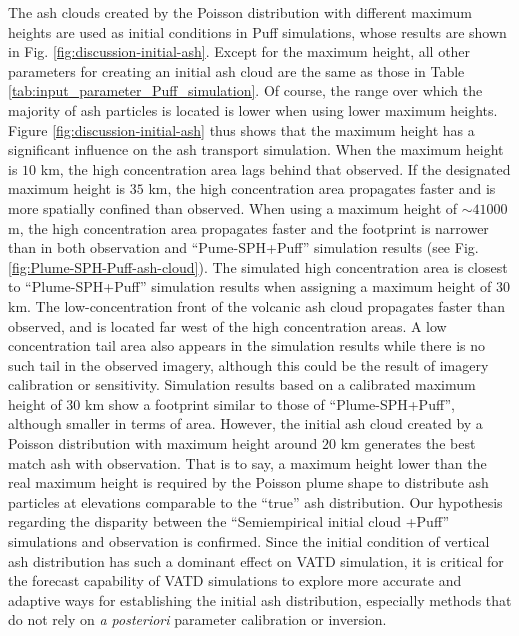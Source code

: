 \documentclass[utf8]{frontiersSCNS} %
\begin{document}
The ash clouds created by the Poisson distribution with different maximum heights are used as initial conditions in Puff simulations, whose results are shown in Fig. \ref{fig:discussion-initial-ash}. Except for the maximum height, all other parameters for creating an initial ash cloud are the same as those in Table \ref{tab:input_parameter_Puff_simulation}. Of course, the range over which the majority of ash particles is located is lower when using lower maximum heights.  Figure \ref{fig:discussion-initial-ash} thus shows that the maximum height has a significant influence on the ash transport simulation. When the maximum height is $10 $ km, the high concentration area  lags behind that observed.  If the designated maximum height is $35 $ km, the high concentration area propagates faster and is more spatially confined than observed. When using a maximum height of $\sim 41000$ m, the high concentration area propagates faster and the footprint is narrower than in both observation and ``Pume-SPH+Puff'' simulation results (see Fig. \ref{fig:Plume-SPH-Puff-ash-cloud}). The simulated high concentration area is closest to ``Plume-SPH+Puff'' simulation results when assigning a maximum height of $30$ km. The low-concentration front of the volcanic ash cloud propagates faster than observed, and is located far west of the high concentration areas. A low concentration tail area also appears in the simulation results while there is no such tail in the observed imagery, although this could be the result of imagery calibration or sensitivity. Simulation results based on a calibrated maximum height of $30 $ km show a footprint similar to those of ``Plume-SPH+Puff'', although smaller in terms of area. However, the initial ash cloud created by a Poisson distribution with maximum height around $20 $ km generates the best match ash with observation. That is to say, a maximum height lower than the real maximum height is required by the Poisson plume shape to distribute ash particles at elevations comparable to the ``true'' ash distribution. Our hypothesis regarding the disparity between the ``Semiempirical initial cloud +Puff'' simulations and observation is confirmed. Since the initial condition of vertical ash distribution has such a dominant effect on VATD simulation, it is critical for the forecast capability of VATD simulations to explore more accurate and adaptive ways for establishing the initial ash distribution, especially methods that do not rely on \textit{a posteriori} parameter calibration or inversion.
\end{document}
